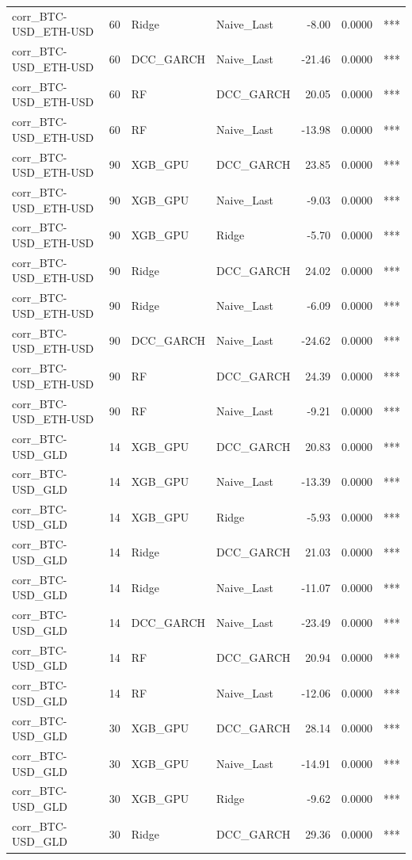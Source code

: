 \begin{table}[H]
\begin{tabular}{llllrrl}
corr_BTC-USD_ETH-USD & 60 & Ridge & Naive_Last & -8.00 & 0.0000 & *** \\
corr_BTC-USD_ETH-USD & 60 & DCC_GARCH & Naive_Last & -21.46 & 0.0000 & *** \\
corr_BTC-USD_ETH-USD & 60 & RF & DCC_GARCH & 20.05 & 0.0000 & *** \\
corr_BTC-USD_ETH-USD & 60 & RF & Naive_Last & -13.98 & 0.0000 & *** \\
corr_BTC-USD_ETH-USD & 90 & XGB_GPU & DCC_GARCH & 23.85 & 0.0000 & *** \\
corr_BTC-USD_ETH-USD & 90 & XGB_GPU & Naive_Last & -9.03 & 0.0000 & *** \\
corr_BTC-USD_ETH-USD & 90 & XGB_GPU & Ridge & -5.70 & 0.0000 & *** \\
corr_BTC-USD_ETH-USD & 90 & Ridge & DCC_GARCH & 24.02 & 0.0000 & *** \\
corr_BTC-USD_ETH-USD & 90 & Ridge & Naive_Last & -6.09 & 0.0000 & *** \\
corr_BTC-USD_ETH-USD & 90 & DCC_GARCH & Naive_Last & -24.62 & 0.0000 & *** \\
corr_BTC-USD_ETH-USD & 90 & RF & DCC_GARCH & 24.39 & 0.0000 & *** \\
corr_BTC-USD_ETH-USD & 90 & RF & Naive_Last & -9.21 & 0.0000 & *** \\
corr_BTC-USD_GLD & 14 & XGB_GPU & DCC_GARCH & 20.83 & 0.0000 & *** \\
corr_BTC-USD_GLD & 14 & XGB_GPU & Naive_Last & -13.39 & 0.0000 & *** \\
corr_BTC-USD_GLD & 14 & XGB_GPU & Ridge & -5.93 & 0.0000 & *** \\
corr_BTC-USD_GLD & 14 & Ridge & DCC_GARCH & 21.03 & 0.0000 & *** \\
corr_BTC-USD_GLD & 14 & Ridge & Naive_Last & -11.07 & 0.0000 & *** \\
corr_BTC-USD_GLD & 14 & DCC_GARCH & Naive_Last & -23.49 & 0.0000 & *** \\
corr_BTC-USD_GLD & 14 & RF & DCC_GARCH & 20.94 & 0.0000 & *** \\
corr_BTC-USD_GLD & 14 & RF & Naive_Last & -12.06 & 0.0000 & *** \\
corr_BTC-USD_GLD & 30 & XGB_GPU & DCC_GARCH & 28.14 & 0.0000 & *** \\
corr_BTC-USD_GLD & 30 & XGB_GPU & Naive_Last & -14.91 & 0.0000 & *** \\
corr_BTC-USD_GLD & 30 & XGB_GPU & Ridge & -9.62 & 0.0000 & *** \\
corr_BTC-USD_GLD & 30 & Ridge & DCC_GARCH & 29.36 & 0.0000 & *** \\

\end{tabular}
\end{table}
